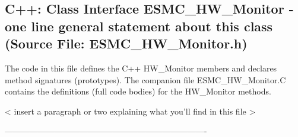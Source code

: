  
\parskip        0pt
\parindent      0pt
\baselineskip  11pt
 
\def\bv{\begin{verbatim}}
\def\ev{\end{verbatim}}
\def\be{\begin{equation}}
\def\ee{\end{equation}}
\def\bea{\begin{eqnarray}}
\def\eea{\end{eqnarray}}
\def\bi{\begin{itemize}}
\def\ei{\end{itemize}}
\def\bn{\begin{enumerate}}
\def\en{\end{enumerate}}
\def\bd{\begin{description}}
\def\ed{\end{description}}
\def\({\left (}
\def\){\right )}
\def\[{\left [}
\def\]{\right ]}
\def\<{\left  \langle}
\def\>{\right \rangle}
\def\cI{{\cal I}}
\def\diag{\mathop{\rm diag}}
\def\tr{\mathop{\rm tr}}


 
\subsection{C++:  Class Interface ESMC\_HW\_Monitor - one line general statement about this class (Source File: ESMC\_HW\_Monitor.h)}


  
  
   The code in this file defines the C++ HW_Monitor members and declares method 
   signatures (prototypes).  The companion file ESMC_HW_Monitor.C contains
   the definitions (full code bodies) for the HW_Monitor methods.
  
   < insert a paragraph or two explaining what you'll find in this file >
  
  -------------------------------------------------------------------------
   
